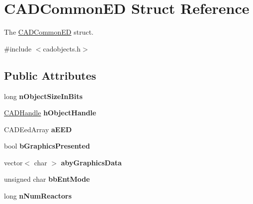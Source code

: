 \hypertarget{struct_c_a_d_common_e_d}{}\section{C\+A\+D\+Common\+ED Struct Reference}
\label{struct_c_a_d_common_e_d}


The \hyperlink{struct_c_a_d_common_e_d}{C\+A\+D\+Common\+ED} struct.  




{\ttfamily \#include $<$cadobjects.\+h$>$}

\subsection*{Public Attributes}
\begin{DoxyCompactItemize}
\item 
long {\bfseries n\+Object\+Size\+In\+Bits}\hypertarget{struct_c_a_d_common_e_d_a9680143c56cb3a1baee4248a8537e936}{}\label{struct_c_a_d_common_e_d_a9680143c56cb3a1baee4248a8537e936}

\item 
\hyperlink{class_c_a_d_handle}{C\+A\+D\+Handle} {\bfseries h\+Object\+Handle}\hypertarget{struct_c_a_d_common_e_d_a53c624ede9eb300b372c606f94d1b980}{}\label{struct_c_a_d_common_e_d_a53c624ede9eb300b372c606f94d1b980}

\item 
C\+A\+D\+Eed\+Array {\bfseries a\+E\+ED}\hypertarget{struct_c_a_d_common_e_d_a2670cd399e0557fc573689bd83fabff1}{}\label{struct_c_a_d_common_e_d_a2670cd399e0557fc573689bd83fabff1}

\item 
bool {\bfseries b\+Graphics\+Presented}\hypertarget{struct_c_a_d_common_e_d_acff0cd1ce191a0305b2b53cffa209a49}{}\label{struct_c_a_d_common_e_d_acff0cd1ce191a0305b2b53cffa209a49}

\item 
vector$<$ char $>$ {\bfseries aby\+Graphics\+Data}\hypertarget{struct_c_a_d_common_e_d_a9927124f326875ab452754fec0582a9d}{}\label{struct_c_a_d_common_e_d_a9927124f326875ab452754fec0582a9d}

\item 
unsigned char {\bfseries bb\+Ent\+Mode}\hypertarget{struct_c_a_d_common_e_d_a43e43cc4103ce1b8b65d7433cf111484}{}\label{struct_c_a_d_common_e_d_a43e43cc4103ce1b8b65d7433cf111484}

\item 
long {\bfseries n\+Num\+Reactors}\hypertarget{struct_c_a_d_common_e_d_a4d1076b75583f9e2f9f3ee2a497e7bc1}{}\label{struct_c_a_d_common_e_d_a4d1076b75583f9e2f9f3ee2a497e7bc1}


\end{DoxyCompactItemize}
